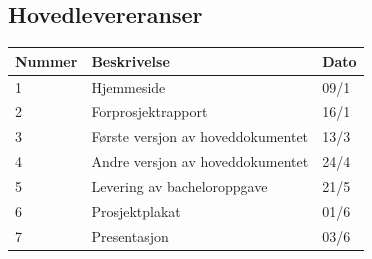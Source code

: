 \documentclass[norsk,a4paper,12pt]{article}
\begin{document}
\subsection{Hovedlevereranser}

\begin{center}
\begin{tabular}{ | m{3cm} | m{8cm}| m{1cm} | } 
 \hline
\textbf{Nummer} & \textbf{Beskrivelse} & \textbf{Dato} \\ 
\hline
1 & Hjemmeside & 09/1 \\
\hline
2 & Forprosjektrapport & 16/1 \\
\hline
3 & Første versjon av hoveddokumentet & 13/3 \\
\hline
4 & Andre versjon av hoveddokumentet & 24/4 \\
\hline
5 & Levering av bacheloroppgave & 21/5 \\
\hline
6 & Prosjektplakat & 01/6 \\
\hline
7 & Presentasjon & 03/6 \\
\hline
\end{tabular}
\end{center}
\end{document}
